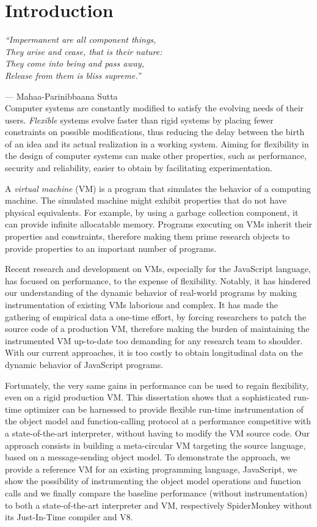 \chapter{Introduction}

\emph{``Impermanent are all component things,\\
They arise and cease, that is their nature:\\
They come into being and pass away,\\
Release from them is bliss supreme.''} 

--- Mahaa-Parinibbaana Sutta \cite{1988last} \\

Computer systems are constantly modified to satisfy the evolving needs of their
users. \textit{Flexible} systems evolve faster than rigid systems by placing fewer
constraints on possible modifications, thus reducing the delay between the
birth of an idea and its actual realization in a working system. Aiming for
flexibility in the design of computer systems can make other properties, such as
performance, security and reliability, easier to obtain by facilitating
experimentation.

A \textit{virtual machine} (VM) is a program that simulates the behavior of a
computing machine.  The simulated machine might exhibit properties that do not have
physical equivalents. For example, by using a garbage collection component, it
can provide infinite allocatable memory. Programs executing on VMs inherit
their properties and constraints, therefore making them prime research objects
to provide properties to an important number of programs.

Recent research and development on VMs, especially for the JavaScript language,
has focused on performance, to the expense of flexibility. Notably, it has
hindered our understanding of the dynamic behavior of real-world programs by
making instrumentation of existing VMs laborious and complex. It has made the
gathering of empirical data a one-time effort, by forcing researchers to patch
the source code of a production VM, therefore making the burden of maintaining the
instrumented VM up-to-date too demanding for any research team to shoulder.
With our current approaches, it is too costly to obtain longitudinal data on
the dynamic behavior of JavaScript programs.

Fortunately, the very same gains in performance can be used to regain
flexibility, even on a rigid production VM. This dissertation shows that a
sophisticated run-time optimizer can be harnessed to provide flexible run-time
instrumentation of the object model and function-calling protocol at a
performance competitive with a state-of-the-art interpreter, without having to
modify the VM source code. Our approach consists in building a meta-circular VM
targeting the source language, based on a message-sending object model. To
demonstrate the approach, we provide a reference VM for an existing programming
language, JavaScript, we show the possibility of instrumenting the object model
operations and function calls and we finally compare the baseline performance
(without instrumentation) to both a state-of-the-art interpreter and VM,
respectively SpiderMonkey without its Just-In-Time compiler and V8.


